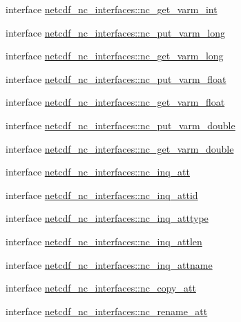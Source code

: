 \begin{DoxyCompactItemize}
\item 
interface \hyperlink{interfacenetcdf__nc__interfaces_1_1nc__get__varm__int}{netcdf\+\_\+nc\+\_\+interfaces\+::nc\+\_\+get\+\_\+varm\+\_\+int}
\item 
interface \hyperlink{interfacenetcdf__nc__interfaces_1_1nc__put__varm__long}{netcdf\+\_\+nc\+\_\+interfaces\+::nc\+\_\+put\+\_\+varm\+\_\+long}
\item 
interface \hyperlink{interfacenetcdf__nc__interfaces_1_1nc__get__varm__long}{netcdf\+\_\+nc\+\_\+interfaces\+::nc\+\_\+get\+\_\+varm\+\_\+long}
\item 
interface \hyperlink{interfacenetcdf__nc__interfaces_1_1nc__put__varm__float}{netcdf\+\_\+nc\+\_\+interfaces\+::nc\+\_\+put\+\_\+varm\+\_\+float}
\item 
interface \hyperlink{interfacenetcdf__nc__interfaces_1_1nc__get__varm__float}{netcdf\+\_\+nc\+\_\+interfaces\+::nc\+\_\+get\+\_\+varm\+\_\+float}
\item 
interface \hyperlink{interfacenetcdf__nc__interfaces_1_1nc__put__varm__double}{netcdf\+\_\+nc\+\_\+interfaces\+::nc\+\_\+put\+\_\+varm\+\_\+double}
\item 
interface \hyperlink{interfacenetcdf__nc__interfaces_1_1nc__get__varm__double}{netcdf\+\_\+nc\+\_\+interfaces\+::nc\+\_\+get\+\_\+varm\+\_\+double}
\item 
interface \hyperlink{interfacenetcdf__nc__interfaces_1_1nc__inq__att}{netcdf\+\_\+nc\+\_\+interfaces\+::nc\+\_\+inq\+\_\+att}
\item 
interface \hyperlink{interfacenetcdf__nc__interfaces_1_1nc__inq__attid}{netcdf\+\_\+nc\+\_\+interfaces\+::nc\+\_\+inq\+\_\+attid}
\item 
interface \hyperlink{interfacenetcdf__nc__interfaces_1_1nc__inq__atttype}{netcdf\+\_\+nc\+\_\+interfaces\+::nc\+\_\+inq\+\_\+atttype}
\item 
interface \hyperlink{interfacenetcdf__nc__interfaces_1_1nc__inq__attlen}{netcdf\+\_\+nc\+\_\+interfaces\+::nc\+\_\+inq\+\_\+attlen}
\item 
interface \hyperlink{interfacenetcdf__nc__interfaces_1_1nc__inq__attname}{netcdf\+\_\+nc\+\_\+interfaces\+::nc\+\_\+inq\+\_\+attname}
\item 
interface \hyperlink{interfacenetcdf__nc__interfaces_1_1nc__copy__att}{netcdf\+\_\+nc\+\_\+interfaces\+::nc\+\_\+copy\+\_\+att}
\item 
interface \hyperlink{interfacenetcdf__nc__interfaces_1_1nc__rename__att}{netcdf\+\_\+nc\+\_\+interfaces\+::nc\+\_\+rename\+\_\+att}
\item 

\end{DoxyCompactItemize}
